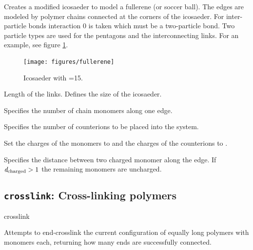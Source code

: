 Creates a modified icosaeder to model a fullerene (or soccer ball).
The edges are modeled by polymer chains connected at the corners of
the icosaeder. For inter-particle bonds interaction $0$ is taken which
must be a two-particle bond. Two particle types are used for the
pentagons and the interconnecting links. For an example, see figure \ref{fig:fullerene}.

\begin{figure}[ht]
 \begin{center}
  \texttt{[image: figures/fullerene]}
  \caption{Icosaeder with =15.}
  \label{fig:fullerene}
  \end{center}
\end{figure}

\begin{arguments}
\item[\var{a}] Length of the links. Defines the size of the icosaeder.
\item[\var{monomers\_per\_chain}] Specifies the number of chain monomers along one edge.
\item[\opt{counterions \var{N_\mathrm{CI}}}] Specifies the number of
  counterions to be placed into the system.
\item[\opt{charges \var{val_\mathrm{monomers}} \var{val_\mathrm{CI}}}]
  Set the charges of the monomers to  and
  the charges of the counterions to .
\item[\opt{distance \var{d_\mathrm{charged}}}] Specifies the distance
  between two charged monomer along the edge. If
  $\mathrm{\mathit{d_\mathrm{charged}}} > 1$ the remaining monomers are uncharged.
\end{arguments}

\subsection{\texttt{crosslink}: Cross-linking polymers}
\begin{essyntax}
  crosslink 
    
\end{essyntax}

Attempts to end-crosslink the current configuration of
 equally long polymers with
 monomers each, returning how many ends are
successfully connected.

